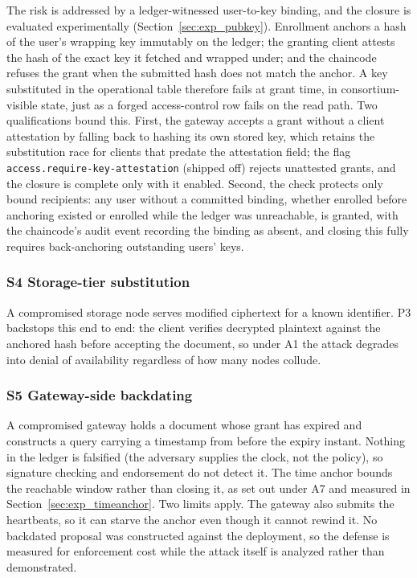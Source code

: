 \documentclass[preprint,12pt]{elsarticle}
\begin{document}
The risk is addressed by a ledger-witnessed user-to-key binding, and the
closure is evaluated experimentally (Section~\ref{sec:exp_pubkey}).
Enrollment anchors a hash of the user's wrapping key immutably on the ledger;
the granting client attests the hash of the exact key it fetched and wrapped
under; and the chaincode refuses the grant when the submitted hash does not
match the anchor. A key substituted in the operational table therefore fails
at grant time, in consortium-visible state, just as a forged access-control
row fails on the read path. Two qualifications bound this. First, the gateway
accepts a grant without a client attestation by falling back to hashing its
own stored key, which retains the substitution race for clients that predate
the attestation field; the flag \texttt{access.require-key-attestation}
(shipped off) rejects unattested grants, and the closure is complete only
with it enabled. Second, the check protects
only bound recipients: any user without a committed binding, whether enrolled
before anchoring existed or enrolled while the ledger was unreachable, is
granted, with the chaincode's audit event recording the binding as absent,
and closing this fully requires back-anchoring outstanding users' keys.

\subsubsection{S4 Storage-tier substitution}
A compromised storage node serves modified ciphertext for a known identifier. P3
backstops this end to end: the client verifies decrypted plaintext against
the anchored hash before accepting the document, so under A1 the attack degrades
into denial of availability regardless of how many nodes collude.

\subsubsection{S5 Gateway-side backdating}
A compromised gateway holds a document whose grant has expired and constructs a
query carrying a timestamp from before the expiry instant. Nothing in the ledger is
falsified (the adversary supplies the clock, not the policy), so signature checking and endorsement do not detect it. The time anchor bounds the
reachable window rather than closing it, as set out under A7 and measured in
Section~\ref{sec:exp_timeanchor}. Two limits apply. The gateway also submits
the heartbeats, so it can starve the anchor even though it cannot rewind it.
No backdated proposal was constructed against the deployment, so the
defense is measured for enforcement cost while the attack itself is analyzed
rather than demonstrated.
\end{document}
